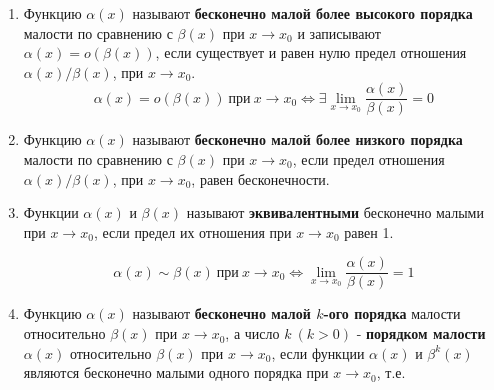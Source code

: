 \begin{enumerate}
\item Функцию $\alpha(x)$ называют \textbf{бесконечно малой более высокого порядка} малости по сравнению с $\beta(x)$ при $x \rightarrow x_0$ и записывают $\alpha(x) = o(\beta(x))$, если существует и равен нулю предел отношения $\alpha(x) / \beta(x)$, при $x \rightarrow x_0$. $$\alpha(x) = o(\beta(x)) \ \text{при} \ x \rightarrow x_0 \iff \exists \lim\limits_{x \to x_0} {\frac{\alpha(x)}{\beta(x)}} = 0$$
\item Функцию $\alpha(x)$ называют \textbf{бесконечно малой более низкого порядка} малости по сравнению с $\beta(x)$ при $x \rightarrow x_0$, если предел отношения $\alpha(x) / \beta(x)$, при $x \rightarrow x_0$, равен бесконечности.
\item Функции $\alpha(x)$ и $\beta(x)$ называют \textbf{эквивалентными} бесконечно малыми при $x \rightarrow x_0$, если предел их отношения при $x \rightarrow x_0$ равен 1.

$$\alpha(x) \sim \beta(x) \ \text{при} \ x \rightarrow x_0 \iff \lim\limits_{x \to x_0}{\frac{\alpha(x)}{\beta(x)}} = 1$$
\item Функцию $\alpha(x)$ называют \textbf{бесконечно малой $k$-ого порядка} малости относительно $\beta(x)$ при $x \rightarrow x_0$, а число $k \ (k > 0)$ - \textbf{порядком малости} $\alpha(x)$ относительно $\beta(x)$ при $x \rightarrow x_0$, если функции $\alpha(x)$ и $\beta^k(x)$ являются бесконечно малыми одного порядка при $x \rightarrow x_0$, т.е.


\end{enumerate}
